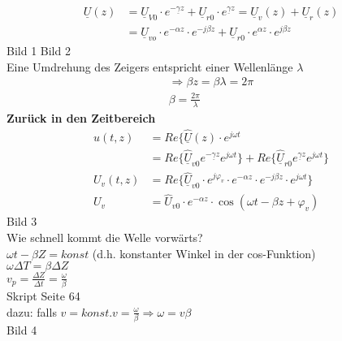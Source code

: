 \begin{align}
	\underline{U}(z) &= \underline{U}_{V0}\cdot e^{-\underline{\gamma}
	z}+\underline{U}_{r0}\cdot
	e^{\underline{\gamma}z}=\underline{U}_v(z)+\underline{U}_r(z)\nonumber\\
	&= \underline{U}_{vo}\cdot e^{-\alpha z}\cdot e^{-j\beta
	z}+\underline{U}_{r0}\cdot e^{\alpha z}\cdot e^{j\beta z}\nonumber
\end{align}
Bild 1 Bild 2\\
Eine Umdrehung des Zeigers entspricht einer Wellenlänge $\lambda$\\
\begin{align}
	\Rightarrow \beta z = \beta \lambda = 2 \pi\nonumber\\
	\boxed{\beta=\frac{2\pi}{\lambda}}\nonumber
\end{align}
\textbf{Zurück in den Zeitbereich}
\begin{align}
	u(t,z)&=Re\{\hat{\underline{U}}(z)\cdot e^{j\omega t}\nonumber\\
	&=Re\{\hat{\underline{U}}_{v0}e^{-\underline{\gamma}z}e^{j\omega
	t}\}+Re\{\hat{\underline{U}}_{r0}e^{\underline{\gamma}z}e^{j\omega
	t}\}\nonumber\\
	U_v(t,z)&=Re\{\underline{\hat{U}}_{v0}\cdot e^{j\varphi_v}\cdot e^{-\alpha
	z}\cdot e^{-j\beta z}\cdot e^{j\omega t}\}\nonumber\\
	U_v&=\hat{U}_{v0}\cdot e^{-\alpha z}\cdot \cos\left(\omega t-\beta
	z+\varphi_v\right)\nonumber
\end{align}
Bild 3\\
Wie schnell kommt die Welle vorwärts?\\
$\omega t-\beta Z=konst$ (d.h. konstanter Winkel in der cos-Funktion)\\
$\omega\Delta T=\beta\Delta Z$\\
$v_p=\frac{\Delta Z}{\Delta t}=\frac{\omega}{\beta}$\\
Skript Seite 64\\
dazu: falls $v=konst. v=\frac{\omega}{\beta}\Rightarrow \omega=v\beta$\\
Bild 4\\

